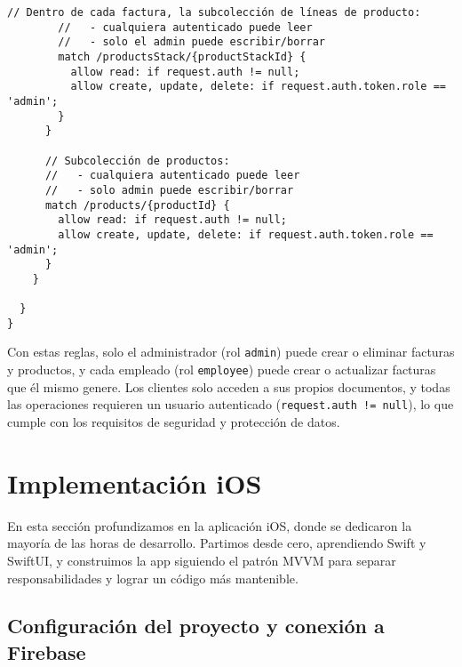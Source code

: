 \begin{large}
\begin{lstlisting}[language={}, caption={Reglas de seguridad de Firestore}]
        // Dentro de cada factura, la subcolección de líneas de producto:
        //   - cualquiera autenticado puede leer
        //   - solo el admin puede escribir/borrar
        match /productsStack/{productStackId} {
          allow read: if request.auth != null;
          allow create, update, delete: if request.auth.token.role == 'admin';
        }
      }
      
      // Subcolección de productos: 
      //   - cualquiera autenticado puede leer
      //   - solo admin puede escribir/borrar
      match /products/{productId} {
        allow read: if request.auth != null;
        allow create, update, delete: if request.auth.token.role == 'admin';
      }
    }
    
  }
}
\end{lstlisting}

Con estas reglas, solo el administrador (rol \texttt{admin}) puede crear o eliminar facturas y productos, y cada empleado (rol \texttt{employee}) puede crear o actualizar facturas que él mismo genere. Los clientes solo acceden a sus propios documentos, y todas las operaciones requieren un usuario autenticado (\texttt{request.auth != null}), lo que cumple con los requisitos de seguridad y protección de datos.

\end{large}

\section{Implementación iOS}

\begin{large}

En esta sección profundizamos en la aplicación iOS, donde se dedicaron la mayoría de las horas de desarrollo. Partimos desde cero, aprendiendo Swift y SwiftUI, y construimos la app siguiendo el patrón MVVM para separar responsabilidades y lograr un código más mantenible.

\end{large}

\subsection{Configuración del proyecto y conexión a Firebase}

